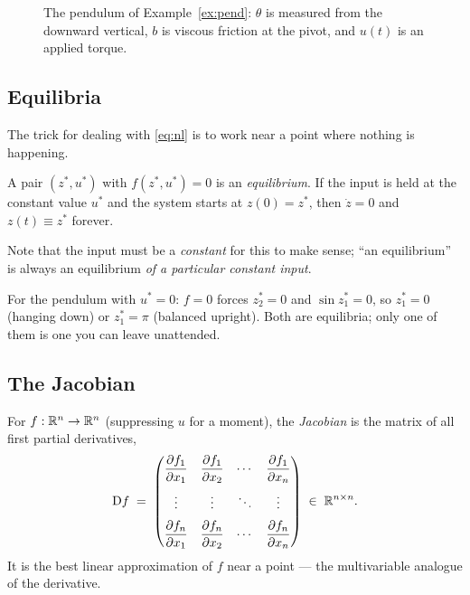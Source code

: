 \documentclass[11pt]{article}
\begin{document}
\begin{figure}[htb]
\centering
{}
\caption{The pendulum of Example~\ref{ex:pend}: $\theta$ is measured from the
downward vertical, $b$ is viscous friction at the pivot, and $u(t)$ is an applied
torque.}
\label{fig:pend}
\end{figure}

\subsection{Equilibria} The trick for dealing with \eqref{eq:nl} is to work near a
point where nothing is happening.

\begin{definition}[equilibrium]\label{def:eq}
A pair $(z^{*},u^{*})$ with $f(z^{*},u^{*}) = 0$ is an \emph{equilibrium}. If the
input is held at the constant value $u^{*}$ and the system starts at
$z(0)=z^{*}$, then $\dot z=0$ and $z(t)\equiv z^{*}$ forever.
\end{definition}
Note that the input must be a \emph{constant} for this to make sense; ``an
equilibrium'' is always an equilibrium \emph{of a particular constant input}.

For the pendulum with $u^{*}=0$: $f=0$ forces $z_2^{*}=0$ and $\sin z_1^{*}=0$,
so $z_1^{*}=0$ (hanging down) or $z_1^{*}=\pi$ (balanced upright). Both are
equilibria; only one of them is one you can leave unattended.

\subsection{The Jacobian}
For $f:\mathbb{R}^{n}\to\mathbb{R}^{n}$ (suppressing $u$ for a moment), the \emph{Jacobian} is the
matrix of all first partial derivatives,
\[
   \mathrm{D} f \;=\;
   \begin{pmatrix}
     \dfrac{\partial f_1}{\partial x_1} & \dfrac{\partial f_1}{\partial x_2} & \cdots & \dfrac{\partial f_1}{\partial x_n}\\[10pt]
     \vdots & \vdots & \ddots & \vdots\\[6pt]
     \dfrac{\partial f_n}{\partial x_1} & \dfrac{\partial f_n}{\partial x_2} & \cdots & \dfrac{\partial f_n}{\partial x_n}
   \end{pmatrix}
   \;\in\;\mathbb{R}^{n\times n}.
\]
It is the best linear approximation of $f$ near a point --- the multivariable
analogue of the derivative.
\end{document}
